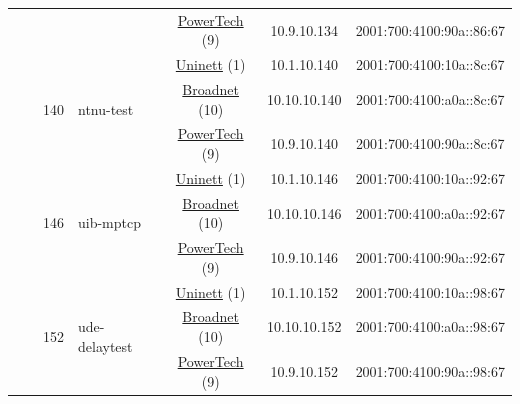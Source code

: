 \begin{small}
\begin{center}
\begin{longtable}{|c|c|c|c|c|c|c|c|}
  &  &  &  & \multicolumn{2}{|c|}{\tiny{\href{http://www.powertech.no}{PowerTech} (9)}} & \tiny{10.9.10.134} & \tiny{2001:700:4100:90a::86:67} \\* \cline{3-3}\cline{4-4}\cline{5-5}\cline{6-6}\cline{7-7}\cline{8-8}
  &  & \multirow{3}{*}{\tiny{140}} & \multicolumn{1}{|l|}{\multirow{3}{*}{\tiny{ntnu-test}}} & \multicolumn{2}{|c|}{\tiny{\href{https://www.uninett.no}{Uninett} (1)}} & \tiny{10.1.10.140} & \tiny{2001:700:4100:10a::8c:67} \\* \cline{5-5}\cline{6-6}\cline{7-7}\cline{8-8}
  &  &  &  & \multicolumn{2}{|c|}{\tiny{\href{https://www.broadnet.no}{Broadnet} (10)}} & \tiny{10.10.10.140} & \tiny{2001:700:4100:a0a::8c:67} \\* \cline{5-5}\cline{6-6}\cline{7-7}\cline{8-8}
  &  &  &  & \multicolumn{2}{|c|}{\tiny{\href{http://www.powertech.no}{PowerTech} (9)}} & \tiny{10.9.10.140} & \tiny{2001:700:4100:90a::8c:67} \\* \cline{3-3}\cline{4-4}\cline{5-5}\cline{6-6}\cline{7-7}\cline{8-8}
  &  & \multirow{3}{*}{\tiny{146}} & \multicolumn{1}{|l|}{\multirow{3}{*}{\tiny{uib-mptcp}}} & \multicolumn{2}{|c|}{\tiny{\href{https://www.uninett.no}{Uninett} (1)}} & \tiny{10.1.10.146} & \tiny{2001:700:4100:10a::92:67} \\* \cline{5-5}\cline{6-6}\cline{7-7}\cline{8-8}
  &  &  &  & \multicolumn{2}{|c|}{\tiny{\href{https://www.broadnet.no}{Broadnet} (10)}} & \tiny{10.10.10.146} & \tiny{2001:700:4100:a0a::92:67} \\* \cline{5-5}\cline{6-6}\cline{7-7}\cline{8-8}
  &  &  &  & \multicolumn{2}{|c|}{\tiny{\href{http://www.powertech.no}{PowerTech} (9)}} & \tiny{10.9.10.146} & \tiny{2001:700:4100:90a::92:67} \\* \cline{3-3}\cline{4-4}\cline{5-5}\cline{6-6}\cline{7-7}\cline{8-8}
  &  & \multirow{3}{*}{\tiny{152}} & \multicolumn{1}{|l|}{\multirow{3}{*}{\tiny{ude-delaytest}}} & \multicolumn{2}{|c|}{\tiny{\href{https://www.uninett.no}{Uninett} (1)}} & \tiny{10.1.10.152} & \tiny{2001:700:4100:10a::98:67} \\* \cline{5-5}\cline{6-6}\cline{7-7}\cline{8-8}
  &  &  &  & \multicolumn{2}{|c|}{\tiny{\href{https://www.broadnet.no}{Broadnet} (10)}} & \tiny{10.10.10.152} & \tiny{2001:700:4100:a0a::98:67} \\* \cline{5-5}\cline{6-6}\cline{7-7}\cline{8-8}
  &  &  &  & \multicolumn{2}{|c|}{\tiny{\href{http://www.powertech.no}{PowerTech} (9)}} & \tiny{10.9.10.152} & \tiny{2001:700:4100:90a::98:67} \\* \cline{3-3}\cline{4-4}\cline{5-5}\cline{6-6}\cline{7-7}\cline{8-8}

\end{longtable}
\end{center}
\end{small}
